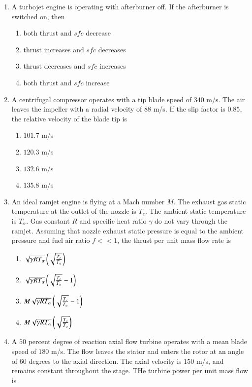 \documentclass[journal,onecolumn]{IEEEtran}
\theoremstyle{remark}
\begin{document}
\begin{enumerate}
    \item A turbojet engine is operating with afterburner off. If the afterburner is switched on, then

	\begin{enumerate}
		\item both thrust and $sfc$ decrease
		\item thrust increases and $sfc$ decreases
		\item thrust decreases and $sfc$ increases
		\item both thrust and $sfc$ increase 
	\end{enumerate}

    \item A centrifugal compressor operates with a tip blade speed of $340$ m/s. The air leaves the impeller with a radial velocity of $88$ m/s. If the slip factor is $0.85$, the relative velocity of the blade tip is

	\begin{enumerate}
		\item $101.7$ m/s
		\item $120.3$ m/s
		\item $132.6$ m/s
		\item $135.8$ m/s
	\end{enumerate}

    \item An ideal ramjet engine is flying at a Mach number $M$. The exhaust gas static temperature at the outlet of the nozzle is $T_e$. The ambient static temperature is $T_{\alpha}$. Gas constant $R$ and specific heat ratio $\gamma$ do not vary through the ramjet. Assuming that nozzle exhaust static pressure is equal to the ambient pressure and fuel air ratio $f << 1$, the thrust per unit mass flow rate is

	\begin{enumerate}
		\item $\sqrt{\gamma R T_{\alpha}}\left(\sqrt{\frac{T_e}{T_{\alpha}}}\right)$
		\item $\sqrt{\gamma R T_{\alpha}}\left(\sqrt{\frac{T_e}{T_{\alpha}}} - 1\right)$
		\item $M\sqrt{\gamma R T_{\alpha}}\left(\sqrt{\frac{T_e}{T_{\alpha}}} - 1\right)$
		\item $M\sqrt{\gamma R T_{\alpha}}\left(\sqrt{\frac{T_e}{T_{\alpha}}}\right)$
	\end{enumerate}


    \item A $50$ percent degree of reaction axial flow turbine operates with a mean blade speed of $180$ m/s. The flow leaves the stator and enters the rotor at an angle of $60$ degrees to the axial direction. The axial velocity is $150$ m/s, and remains constant throughout the stage. THe turbine power per unit mass flow is


\end{enumerate}
\end{document}
